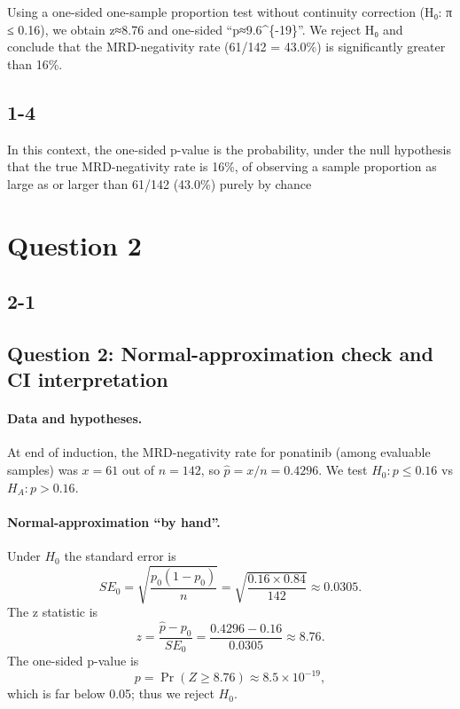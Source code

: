 \documentclass[
]{article}
\begin{document}
Using a one-sided one-sample proportion test without continuity
correction (H₀: π ≤ 0.16), we obtain z≈8.76 and one-sided
``p≈9.6\^{}\{-19\}''. We reject H₀ and conclude that the
MRD-negativity rate (61/142 = 43.0\%) is significantly greater than
16\%.

\subsection{1-4}\label{section-3}

In this context, the one-sided p-value is the probability, under the
null hypothesis that the true MRD-negativity rate is 16\%, of observing
a sample proportion as large as or larger than 61/142 (43.0\%) purely by
chance

\section{Question 2}\label{question-2}

\subsection{2-1}\label{section-4}

\subsection*{Question 2: Normal-approximation check and CI interpretation}

\paragraph{Data and hypotheses.}

At end of induction, the MRD-negativity rate for ponatinib (among
evaluable samples) was \(x=61\) out of \(n=142\), so
\(\hat p = x/n = 0.4296\). We test \(H_0: p \le 0.16\) vs
\(H_A: p>0.16\).

\paragraph{Normal-approximation ``by hand''.}

Under \(H_0\) the standard error is \[
SE_0=\sqrt{\frac{p_0(1-p_0)}{n}}
=\sqrt{\frac{0.16\times0.84}{142}}
\approx 0.0305.
\] The z statistic is \[
z=\frac{\hat p-p_0}{SE_0}
=\frac{0.4296-0.16}{0.0305}
\approx 8.76.
\] The one-sided p-value is \[
p = \Pr(Z\ge 8.76)\approx 8.5\times 10^{-19},
\] which is far below 0.05; thus we reject \(H_0\).
\end{document}
